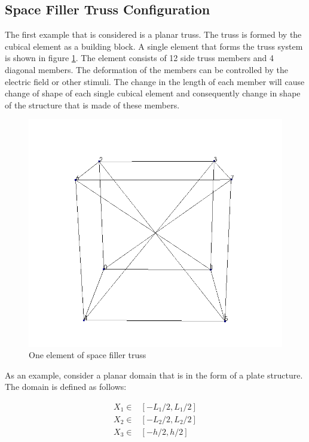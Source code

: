 \subsection{Space Filler Truss Configuration}
The first example that is considered is a planar truss.
The truss is formed by the cubical element as a building block. 
A single element that forms the truss system is shown in figure \ref{fig:cuber_space_filler_truss}.
The element consists of 12 side truss members and 4 diagonal members.
The deformation of the members can be controlled by the electric field or other stimuli.
The change in the length of each member will cause change of shape of each single cubical element and consequently change in shape of the structure that is made of these members.

\begin{figure} 
\centering
\includegraphics[width=5.0in]{./chap_5_active_trusses/images_space_filler/cube.png}
\caption{One element of space filler truss}
\label{fig:cuber_space_filler_truss}
\end{figure}

As an example, consider a planar domain that is in the form of a plate structure.
The domain is defined as follows:

\begin{equation}
\begin{aligned}
X_1 \in & [-L_1/2,L_1/2] \\
X_2 \in & [-L_2/2,L_2/2] \\
X_3 \in & [-h/2,h/2]
\end{aligned}
\label{planar_truss_domain:eqn}
\end{equation}
 
